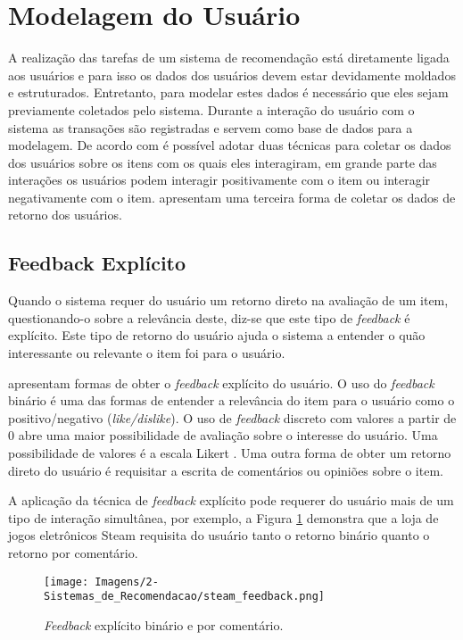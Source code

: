 \section{Modelagem do Usuário}
A realização das tarefas de um sistema de recomendação está diretamente ligada aos usuários e para isso os dados dos usuários devem estar devidamente moldados e estruturados. Entretanto, para modelar estes dados é necessário que eles sejam previamente coletados pelo sistema. Durante a interação do usuário com o sistema as transações são registradas e servem como base de dados para a modelagem. De acordo com  é possível adotar duas técnicas para coletar os dados dos usuários sobre os itens com os quais eles interagiram, em grande parte das interações os usuários podem interagir positivamente com o item ou interagir negativamente com o item.  apresentam uma terceira forma de coletar os dados de retorno dos usuários.

\subsection{Feedback Explícito}
Quando o sistema requer do usuário um retorno direto na avaliação de um item, questionando-o sobre a relevância deste, diz-se que este tipo de \textit{feedback} é explícito. Este tipo de retorno do usuário ajuda o sistema a entender o quão interessante ou relevante o item foi para o usuário.

 apresentam formas de obter o \textit{feedback} explícito do usuário. O uso do \textit{feedback} binário é uma das formas de entender a relevância do item para o usuário como o positivo/negativo (\textit{like/dislike}). O uso de \textit{feedback} discreto com valores a partir de 0 abre uma maior possibilidade de avaliação sobre o interesse do usuário. Uma possibilidade de valores é a escala Likert \cite{Lucian:2016}. Uma outra forma de obter um retorno direto do usuário é requisitar a escrita de comentários ou opiniões sobre o item.

A aplicação da técnica de \textit{feedback} explícito pode requerer do usuário mais de um tipo de interação simultânea, por exemplo, a Figura \ref{fig:steam_feedback} demonstra que a loja de jogos eletrônicos Steam requisita do usuário tanto o retorno binário quanto o retorno por comentário.

\begin{figure}[hbt!]
    \centering
    \texttt{[image: Imagens/2-Sistemas\_de\_Recomendacao/steam\_feedback.png]}
    \caption{\textit{Feedback} explícito binário e por comentário.}
    \label{fig:steam_feedback}
\end{figure}

